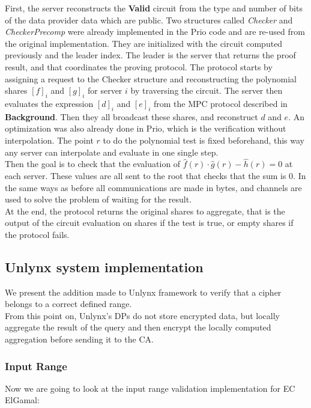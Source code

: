 \documentclass{article}
\begin{document}
First, the server reconstructs the \textbf{Valid} circuit from the type and number of bits of the data provider data which are public.  Two structures called \textit{Checker} and \textit{CheckerPrecomp} were already implemented in the Prio code and are re-used from the original implementation. They are initialized with the circuit computed previously and the leader index. The leader is the server that returns the proof result, and that coordinates the proving protocol.
The protocol starts by assigning a request to the Checker structure and reconstructing the polynomial shares $[f]_i $ and $[g]_i$ for server $i$ by traversing the circuit. The server then evaluates the expression $[d]_i $ and $[e]_i$ from the MPC protocol described in \textbf{Background}. Then they all broadcast these shares, and reconstruct $d$ and $e$.
An optimization was also already done in Prio, which is the verification without interpolation. The point $r$ to do the polynomial test is fixed beforehand, this way any server can interpolate and evaluate in one single step.\\
Then the goal is to check that the evaluation of $\hat{f}(r) \cdot \hat{g}(r) -\hat{h}(r) = 0$ at each server. These values are all sent to the root that checks that the sum is 0.
In the same ways as before all communications are made in bytes, and channels are used to solve the problem of waiting for the result.\\
At the end, the protocol returns the original shares to aggregate, that is the output of the circuit evaluation on shares  if the test is true, or empty shares if the protocol fails.

\subsection{Unlynx system implementation}
We present the addition made to Unlynx framework to verify that a cipher belongs to a correct defined range.\\
From this point on, Unlynx's DPs do not store encrypted data, but locally aggregate the result of the query and then encrypt the locally computed aggregation before sending it to the CA.

\subsubsection*{Input Range}
Now we are going to look at the input range validation implementation for EC ElGamal:\\
\end{document}
